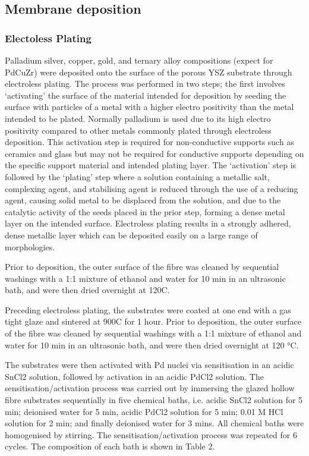 \subsection{Membrane deposition}
\subsubsection{Electoless Plating}
Palladium silver, copper, gold, and ternary alloy compositions (expect for PdCuZr) were 
deposited onto the surface of the porous YSZ substrate through electroless plating. 
The process was performed in two steps; the first involves ‘activating’ the surface of the 
material intended for deposition by seeding the surface with particles of a metal with a 
higher electro positivity than the metal intended to be plated. Normally palladium is used due 
to its high electro positivity compared to other metals commonly plated through electroless 
deposition. This activation step is required for non-conductive supports such as ceramics and 
glass but may not be required for conductive supports depending on the specific support 
material and intended plating layer. The ‘activation’ step is followed by the ‘plating’ step 
where a solution containing a metallic salt, complexing agent, and stabilising agent is 
reduced through the use of a reducing agent, causing solid metal to be displaced from the 
solution, and due to the catalytic activity of the seeds placed in the prior step, forming a 
dense metal layer on the intended surface. Electroless plating results in a strongly adhered, 
dense metallic layer which can be deposited easily on a large range of morphologies.

Prior to deposition, the outer surface of the fibre was cleaned by sequential washings with a 
1:1 mixture of ethanol and water for 10 min in an ultrasonic bath, and were then dried overnight 
at 120\textdegree C.

Preceding electroless plating, the substrates were coated at one end with a gas tight glaze 
and sintered at 900\textdegree C for 1 hour. Prior to deposition, the outer surface of the fibre was 
cleaned by sequential washings with a 1:1 mixture of ethanol and water for 10 min in an 
ultrasonic bath, and were then dried overnight at 120 °C.

The substrates were then activated with Pd nuclei via sensitisation in an acidic SnCl2 
solution, followed by activation in an acidic PdCl2 solution. The sensitisation/activation 
process was carried out by immersing the glazed hollow fibre substrates sequentially in five 
chemical baths, i.e. acidic SnCl2 solution for 5 min; deionised water for 5 min, acidic PdCl2 
solution for 5 min; 0.01 M HCl solution for 2 min; and finally deionised water for 3 mins. 
All chemical baths were homogenised by stirring. The sensitisation/activation process was 
repeated for 6 cycles. The composition of each bath is shown in Table 2.

